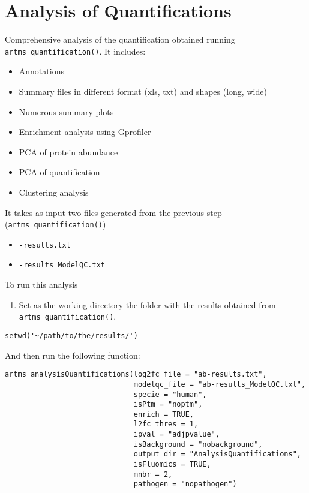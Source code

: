 \documentclass[]{article}
\providecommand{\tightlist}{%
  \setlength{\itemsep}{0pt}\setlength{\parskip}{0pt}}
\begin{document}
\section{Analysis of Quantifications}\label{analysis-of-quantifications}

Comprehensive analysis of the quantification obtained running
\texttt{artms\_quantification()}. It includes:

\begin{itemize}
\tightlist
\item
  Annotations
\item
  Summary files in different format (xls, txt) and shapes (long, wide)
\item
  Numerous summary plots
\item
  Enrichment analysis using Gprofiler
\item
  PCA of protein abundance
\item
  PCA of quantification
\item
  Clustering analysis
\end{itemize}

It takes as input two files generated from the previous step
(\texttt{artms\_quantification()})

\begin{itemize}
\tightlist
\item
  \texttt{-results.txt}
\item
  \texttt{-results\_ModelQC.txt}
\end{itemize}

To run this analysis

\begin{enumerate}
\def\labelenumi{\arabic{enumi}.}
\tightlist
\item
  Set as the working directory the folder with the results obtained from
  \texttt{artms\_quantification()}.
\end{enumerate}

\begin{verbatim}
setwd('~/path/to/the/results/')
\end{verbatim}

And then run the following function:

\begin{verbatim}
artms_analysisQuantifications(log2fc_file = "ab-results.txt",
                              modelqc_file = "ab-results_ModelQC.txt",
                              specie = "human",
                              isPtm = "noptm",
                              enrich = TRUE,
                              l2fc_thres = 1,
                              ipval = "adjpvalue",
                              isBackground = "nobackground",
                              output_dir = "AnalysisQuantifications",
                              isFluomics = TRUE,
                              mnbr = 2,
                              pathogen = "nopathogen")
\end{verbatim}
\end{document}
